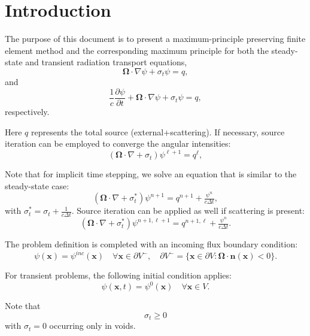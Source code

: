 \section{Introduction}
The purpose of this document is to present a maximum-principle preserving
finite element method and the corresponding maximum principle for both the
steady-state and transient radiation transport equations,
\begin{equation}\label{ss}
	\mathbf{\Omega}\cdot\nabla\psi + \sigma_t\psi = q,
\end{equation}
and
\begin{equation}\label{tr}
	\frac{1}{c}\frac{\partial \psi}{\partial t} + \mathbf{\Omega}\cdot\nabla\psi
      + \sigma_t\psi = q,
\end{equation}
respectively.

Here $q$ represents the total source (external+scattering). If necessary, source
iteration can be employed to converge the angular intensities:
\begin{equation}
	(\mathbf{\Omega}\cdot\nabla + \sigma_t)\psi^{\ell+1} = q^\ell,
\end{equation}

Note that for implicit time stepping, we solve an equation that is similar
to the steady-state case:
\begin{equation}
	(\mathbf{\Omega}\cdot\nabla + \sigma_t^\ast)\psi^{n+1} =
      q^{n+1}+\tfrac{\psi^n}{c\Delta t},
\end{equation}
with $\sigma_t^\ast = \sigma_t + \tfrac{1}{c\Delta t}$. Source iteration can be applied as well if scattering is present:
\begin{equation}
	(\mathbf{\Omega}\cdot\nabla + \sigma_t^\ast)\psi^{n+1,\ell+1} = q^{n+1,\ell}+\tfrac{\psi^n}{c\Delta t}.
\end{equation}

The problem definition is completed with an incoming flux boundary condition:
\begin{equation}
   \psi(\mathbf{x}) = \psi^{inc}(\mathbf{x})  \quad \forall \mathbf{x}\in \partial V^-,
      \quad \partial V^- = \{\mathbf{x}\in\partial V: \mathbf{\Omega}\cdot\mathbf{n}(\mathbf{x})<0\}.
\end{equation}

For transient problems, the following initial condition applies:
\begin{equation}
   \psi(\mathbf{x},t) = \psi^0(\mathbf{x})  \quad \forall \mathbf{x}\in V.
\end{equation}

Note that
\begin{equation}
\sigma_t \ge 0
\end{equation}
with $\sigma_t=0$ occurring only in voids.